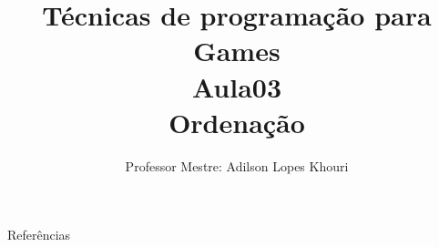 \documentclass[compress, hyperref={pdfpagelayout=SinglePage}]{beamer}
\title[AED - Aula 03]{Técnicas de programação para Games \\ Aula03 \\ Ordenação}
\author{Professor Mestre: Adilson Lopes Khouri}
\begin{document}
	\begin{frame}
		\titlepage
	\end{frame}
	
	
	
	

	
	
	
	
	

	

	\begin{frame}{}
		\begin{block}{Referências}
			\tiny
			\nocite{*}
			
	    		
		\end{block}
	\end{frame}
\end{document}
